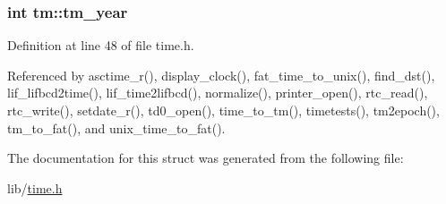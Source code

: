 \subsubsection[{\texorpdfstring{tm\+\_\+year}{tm_year}}]{\setlength{\rightskip}{0pt plus 5cm}int tm\+::tm\+\_\+year}\hypertarget{structtm_a33adf78fd6476b2120ce3b9c4a852053}{}\label{structtm_a33adf78fd6476b2120ce3b9c4a852053}


Definition at line 48 of file time.\+h.



Referenced by asctime\+\_\+r(), display\+\_\+clock(), fat\+\_\+time\+\_\+to\+\_\+unix(), find\+\_\+dst(), lif\+\_\+lifbcd2time(), lif\+\_\+time2lifbcd(), normalize(), printer\+\_\+open(), rtc\+\_\+read(), rtc\+\_\+write(), setdate\+\_\+r(), td0\+\_\+open(), time\+\_\+to\+\_\+tm(), timetests(), tm2epoch(), tm\+\_\+to\+\_\+fat(), and unix\+\_\+time\+\_\+to\+\_\+fat().



The documentation for this struct was generated from the following file\+:\begin{DoxyCompactItemize}
\item 
lib/\hyperlink{time_8h}{time.\+h}\end{DoxyCompactItemize}
